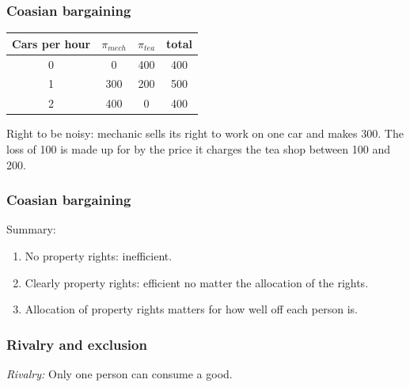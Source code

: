 \documentclass[xcolor=pdftex,dvipsnames]{beamer}
\begin{document}
\begin{frame}
\frametitle{Coasian bargaining}
\begin{center}
\begin{tabular}{|c|ccc|}
\hline  Cars per hour & $\pi_{mech}$ & $\pi_{tea}$ & total\\
\hline 0 & 0 & 400 & 400\\
\hline {\color{red} 1} &{\color{red} 300} & {\color{red} 200} & {\color{red} 500}\\
\hline 2 & 400&0 & 400\\
\hline
\end{tabular}
\end{center}
Right to be noisy: mechanic sells its right to work on one car and makes
300. The loss of 100 is made up for by the price it charges the tea shop
between 100 and 200.


\end{frame}
\begin{frame}
  \frametitle{Coasian bargaining}
Summary:  \begin{enumerate}
  \item<2-> No property rights: inefficient.
  \item<3-> Clearly property rights: efficient no matter the
    allocation of the rights.
  \item<4-> Allocation of property rights matters for how well off
    each person is.
  \end{enumerate}
\bigskip

\end{frame}


\begin{frame}
  \frametitle{Rivalry and exclusion}
\emph{Rivalry:} Only one person can consume a good.

\bigskip
{}
\bigskip



\bigskip
{}

\bigskip
{}
\end{frame}
\end{document}
